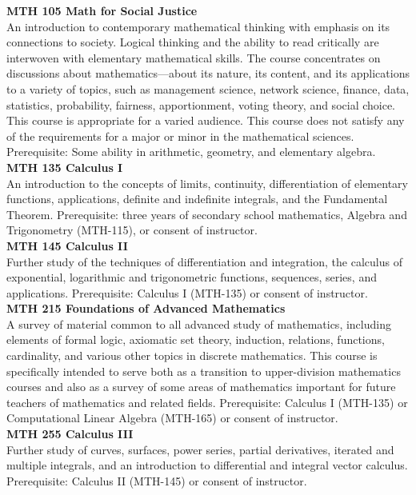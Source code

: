 \documentclass[
  letterpaper,
]{scrbook}
\begin{document}
\textbf{MTH 105 Math for Social Justice}\\
An introduction to contemporary mathematical thinking with emphasis on
its connections to society. Logical thinking and the ability to read
critically are interwoven with elementary mathematical skills. The
course concentrates on discussions about mathematics---about its nature,
its content, and its applications to a variety of topics, such as
management science, network science, finance, data, statistics,
probability, fairness, apportionment, voting theory, and social choice.
This course is appropriate for a varied audience. This course does not
satisfy any of the requirements for a major or minor in the mathematical
sciences. Prerequisite: Some ability in arithmetic, geometry, and
elementary algebra.\\
\textbf{MTH 135 Calculus I}\\
An introduction to the concepts of limits, continuity, differentiation
of elementary functions, applications, definite and indefinite
integrals, and the Fundamental Theorem. Prerequisite: three years of
secondary school mathematics, Algebra and Trigonometry (MTH-115), or
consent of instructor.\\
\textbf{MTH 145 Calculus II}\\
Further study of the techniques of differentiation and integration, the
calculus of exponential, logarithmic and trigonometric functions,
sequences, series, and applications. Prerequisite: Calculus I (MTH-135)
or consent of instructor.\\
\textbf{MTH 215 Foundations of Advanced Mathematics}\\
A survey of material common to all advanced study of mathematics,
including elements of formal logic, axiomatic set theory, induction,
relations, functions, cardinality, and various other topics in discrete
mathematics. This course is specifically intended to serve both as a
transition to upper-division mathematics courses and also as a survey of
some areas of mathematics important for future teachers of mathematics
and related fields. Prerequisite: Calculus I (MTH-135) or Computational
Linear Algebra (MTH-165) or consent of instructor.\\
\textbf{MTH 255 Calculus III}\\
Further study of curves, surfaces, power series, partial derivatives,
iterated and multiple integrals, and an introduction to differential and
integral vector calculus. Prerequisite: Calculus II (MTH-145) or consent
of instructor.\\
\end{document}
